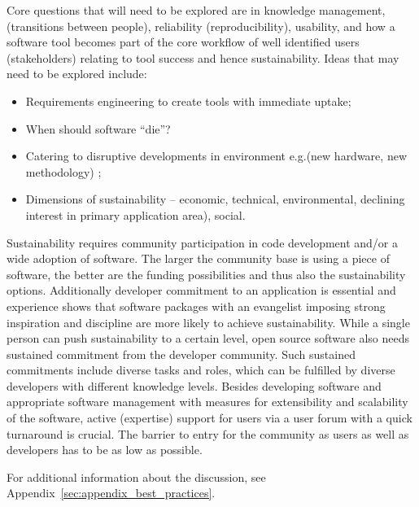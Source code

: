 Core questions that will need to be explored are in knowledge management, 
(transitions between people), reliability (reproducibility), usability, and how a software tool becomes part of the core workflow of well identified users (stakeholders)
relating to tool success and hence sustainability.  Ideas 
that may need to be explored include:
\begin{itemize}
\item Requirements engineering to create tools with immediate uptake;
\item When should software ``die''?
\item Catering to disruptive developments in environment e.g.(new hardware, new methodology) ;
\item Dimensions of sustainability -- economic, technical, environmental, 
declining interest in primary application area),  social.
\end{itemize}

Sustainability requires community participation in code development and/or a wide adoption of software.
The larger the community base is using a piece of software, the better are the funding possibilities and thus also the sustainability options.
Additionally developer commitment to an application is essential and experience shows that software packages with an evangelist imposing strong inspiration and discipline are more likely to achieve sustainability.
While a single person can push sustainability to a certain level, open source software also needs sustained commitment from the developer community.
Such sustained commitments include diverse tasks and roles, which can be fulfilled by diverse developers with different knowledge levels.
Besides developing software and appropriate software management with measures for extensibility and scalability of the software, active (expertise) support for users via a user forum with a quick turnaround is crucial.
The barrier to entry for the community as users as well as developers has to be as low as possible.

For additional information about the discussion, see Appendix~\ref{sec:appendix_best_practices}.


